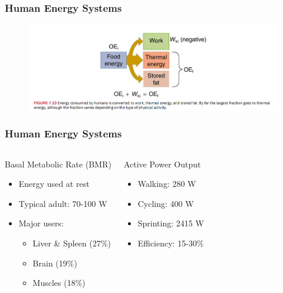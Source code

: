 \documentclass{beamer}
\begin{document}
\begin{frame}
\frametitle{Human Energy Systems}
\begin{figure}
    \centering
    \includegraphics[width=1\linewidth]{CH7/CH7.7-7.9/Screenshot 2024-11-28 120054.png}
\end{figure}
\end{frame}
\begin{frame}
\frametitle{Human Energy Systems}
\begin{columns}
\begin{block}{Basal Metabolic Rate (BMR)}
\begin{itemize}
\item Energy used at rest
\item Typical adult: 70-100 W
\item Major users:
  \begin{itemize}
  \item Liver \& Spleen (27\%)
  \item Brain (19\%)
  \item Muscles (18\%)
  \end{itemize}
\end{itemize}
\end{block}

\begin{block}{Active Power Output}
\begin{itemize}
\item Walking: 280 W
\item Cycling: 400 W
\item Sprinting: 2415 W
\item Efficiency: 15-30\%
\end{itemize}
\end{block}
\end{columns}
\end{frame}
\end{document}
